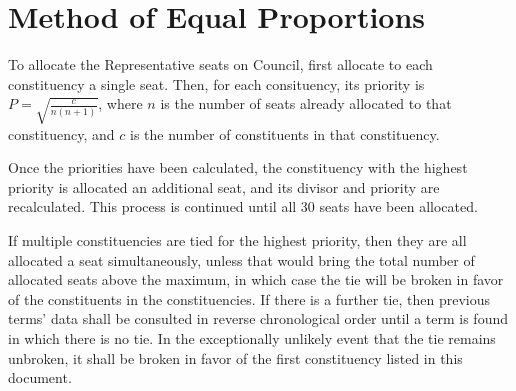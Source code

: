 \section{Method of Equal Proportions}
To allocate the Representative seats on Council, first allocate to each
constituency a single seat. Then, for each consituency, its priority is $P =
\sqrt{\frac{c}{n(n+1)}}$, where $n$ is the number of seats already allocated to
that constituency, and $c$ is the number of constituents in that constituency.

Once the priorities have been calculated, the constituency with the highest
priority is allocated an additional seat, and its divisor and priority are
recalculated. This process is continued until all 30 seats have been allocated.

If multiple constituencies are tied for the highest priority, then they are all
allocated a seat simultaneously, unless that would bring the total number of
allocated seats above the maximum, in which case the tie will be broken in favor
of the constituents in the constituencies. If there is a further tie, then
previous terms' data shall be consulted in reverse chronological order until a
term is found in which there is no tie. In the exceptionally unlikely event that
the tie remains unbroken, it shall be broken in favor of the first constituency
listed in this document.
